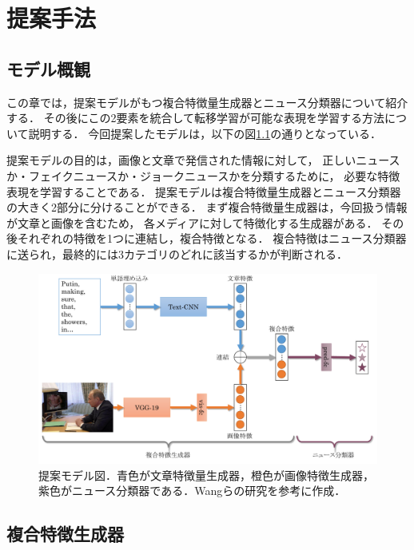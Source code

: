 %
\chapter{提案手法}
%
\section{モデル概観}
この章では，提案モデルがもつ複合特徴量生成器とニュース分類器について紹介する．
その後にこの2要素を統合して転移学習が可能な表現を学習する方法について説明する．
今回提案したモデルは，以下の図\ref{fig:model}の通りとなっている．

提案モデルの目的は，画像と文章で発信された情報に対して，
正しいニュースか・フェイクニュースか・ジョークニュースかを分類するために，
必要な特徴表現を学習することである．
提案モデルは複合特徴量生成器とニュース分類器の大きく2部分に分けることができる．
まず複合特徴量生成器は，今回扱う情報が文章と画像を含むため，
各メディアに対して特徴化する生成器がある．
その後それぞれの特徴を1つに連結し，複合特徴となる．
複合特徴はニュース分類器に送られ，最終的には3カテゴリのどれに該当するかが判断される．
% 
\begin{figure}[h]
    \centering
    \includegraphics[width=\linewidth]{images/methodology.pdf}
    \caption{提案モデル図．青色が文章特徴量生成器，橙色が画像特徴生成器，紫色がニュース分類器である．Wangらの研究\cite{wang2018eann}を参考に作成．}
    \label{fig:model}
\end{figure}
%
\section{複合特徴生成器}
%
